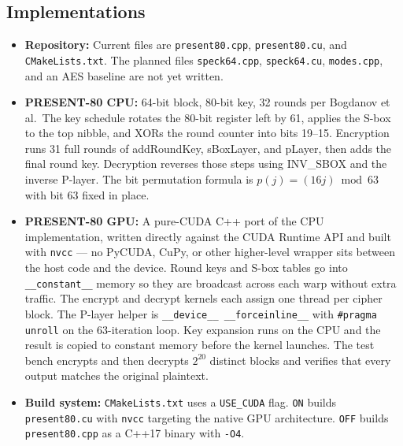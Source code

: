 \documentclass[10pt]{article}
\begin{document}
\subsection*{Implementations}
\begin{itemize}
  \item \textbf{Repository:} Current files are \texttt{present80.cpp}, \texttt{present80.cu},
        and \texttt{CMakeLists.txt}. The planned files \texttt{speck64.cpp},
        \texttt{speck64.cu}, \texttt{modes.cpp}, and an AES baseline are not yet written.

  \item \textbf{PRESENT-80 CPU:} 64-bit block, 80-bit key, 32 rounds per Bogdanov et al.\
        The key schedule rotates the 80-bit register left by 61, applies the S-box to
        the top nibble, and XORs the round counter into bits 19--15. Encryption runs 31
        full rounds of addRoundKey, sBoxLayer, and pLayer, then adds the final round key.
        Decryption reverses those steps using INV\_SBOX and the inverse P-layer. The bit
        permutation formula is $p(j) = (16j) \bmod 63$ with bit 63 fixed in place.

  \item \textbf{PRESENT-80 GPU:} A pure-CUDA C++ port of the CPU implementation,
        written directly against the CUDA Runtime API and built with \texttt{nvcc}
        --- no PyCUDA, CuPy, or other higher-level wrapper sits between the host
        code and the device. Round keys and S-box tables go into
        \texttt{\_\_constant\_\_} memory so they are broadcast across each warp
        without extra traffic. The encrypt and decrypt kernels each assign one
        thread per cipher block. The P-layer helper is
        \texttt{\_\_device\_\_ \_\_forceinline\_\_} with \texttt{\#pragma unroll}
        on the 63-iteration loop. Key expansion runs on the CPU and the result is
        copied to constant memory before the kernel launches. The test bench
        encrypts and then decrypts $2^{20}$ distinct blocks and verifies that every
        output matches the original plaintext.

  \item \textbf{Build system:} \texttt{CMakeLists.txt} uses a \texttt{USE\_CUDA} flag.
        \texttt{ON} builds \texttt{present80.cu} with \texttt{nvcc} targeting the native
        GPU architecture. \texttt{OFF} builds \texttt{present80.cpp} as a C++17 binary
        with \texttt{-O4}.
\end{itemize}
\end{document}
